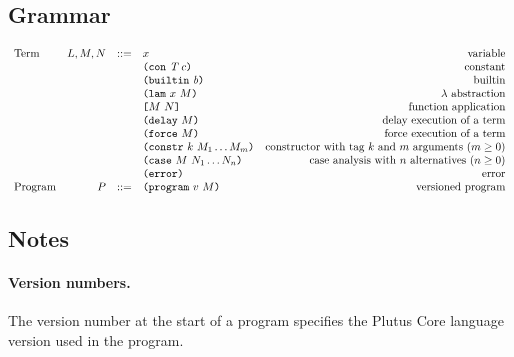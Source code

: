 \subsection{Grammar}
\begin{minipage}{\linewidth}
    \centering
    \[\begin{array}{lrclr}
    \textrm{Term}       & L,M,N  & ::= & x                               & \textrm{variable}\\
                        &        &     & \texttt{(} \texttt{con} ~ \textit{T} ~ c \texttt{)}                    & \textrm{constant}\\
                        &        &     & \texttt{(} \texttt{builtin} ~ \mathit{b} \texttt{)}                     & \textrm{builtin}\\
                        &        &     & \texttt{(} \texttt{lam} ~ x ~ M  \texttt{)}                     & \textrm{$\lambda$ abstraction}\\
                        &        &     & \texttt{[} M ~ N \texttt{]}                     & \textrm{function application}\\
                        &        &     & \texttt{(} \texttt{delay} ~ M \texttt{)}                       & \textrm{delay execution of a term}\\
                        &        &     & \texttt{(} \texttt{force} ~ M \texttt{)}                       & \textrm{force execution of a term}\\
                        &        &     & \texttt{(} \texttt{constr} ~ k ~ M_1 \ldots M_m \texttt{)}      & \textrm{constructor with tag $k$ and $m$ arguments ($m \geq 0$)}\\
                        &        &     & \texttt{(} \texttt{case} ~ M ~ N_1 \ldots N_n \texttt{)}        & \textrm{case analysis with $n$ alternatives ($n \geq 0$)}\\
                        &        &     & \texttt{(} \texttt{error} \texttt{)}                         & \textrm{error}\\
        \textrm{Program}& P      & ::= & \texttt{(} \texttt{program} ~ v ~ M \texttt{)}                  & \textrm{versioned program}

    \end{array}\]
    \label{fig:untyped-grammar}
\end{minipage}


\subsection{Notes}
\label{sec:grammar-notes}
\paragraph{Version numbers.} The version number at the start of a program specifies
the Plutus Core language version used in the program.

